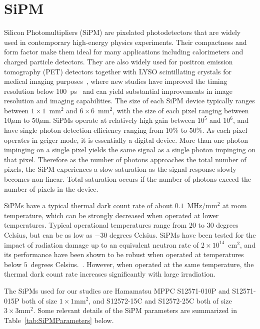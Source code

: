 \section{SiPM}
\label{sec:sipm}

Silicon Photomultipliers (SiPM) are pixelated photodetectors that are widely
used in contemporary high-energy physics experiments. Their compactness and form
factor make them ideal for many applications including calorimeters and charged
particle detectors. They are also widely used for positron emission tomography
(PET) detectors together with LYSO scintillating crystals for medical imaging
purposes~\cite{Vandenberghe2016}, where new studies have improved the 
timing resolution below $100$~ps~\cite{LecoqTOFPET} and 
 can yield substantial improvements in image resolution and imaging 
 capabilities. The size of each SiPM device typically
ranges between $1\times 1$~$\mathrm{mm}^{2}$ and $6\times 6$~$\mathrm{mm}^{2}$,
with the size of each pixel ranging between $10\mu$m to $50\mu$m. SiPMs operate
at relatively high gain between $10^{5}$ and $10^{6}$, and have single photon detection
efficiency ranging from $10\%$ to $50\%$. As each pixel operates in geiger mode, it is essentially a digital
device. More than one photon impinging on a single pixel yields the same signal
as a single photon impinging on that pixel. Therefore as the number of photons
approaches the total number of pixels, the SiPM experiences a slow saturation as
the signal response slowly becomes non-linear. Total saturation occurs 
if the number of photons exceed the number of pixels in the device. 


SiPMs have a typical thermal dark count rate of about
$0.1$~MHz/$\mathrm{mm}^{2}$ at room temperature, which can be strongly decreased
when operated at lower temperatures. Typical operational temperatures range from
$20$ to $30$ degrees Celsius, but can be as low as $-30$ degrees Celsius. SiPMs
have been tested for the impact of radiation damage up to an equivalent neutron
rate of $2\times10^{14}$~$\mathrm{cm}^{2}$, and its performance have been shown
to be robust when operated at temperatures below $5$~degrees
Celsius.~\cite{SiPMIrradiated1,SiPMIrradiated2}. However, when operated at the
same temperature, the thermal dark count rate increases significantly with large
irradiation.

The SiPMs used for our studies are Hamamatsu MPPC S12571-010P and S12571-015P both of 
size $1\times1\mathrm{mm}^{2}$, and S12572-15C and S12572-25C both of size 
$3\times3\mathrm{mm}^{2}$. Some relevant details of the SiPM parameters
are summarized in Table~\ref{tab:SiPMParameters} below.

